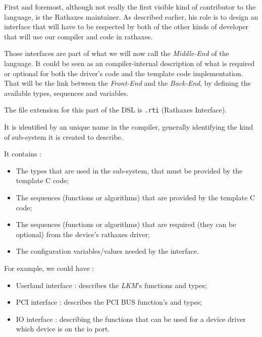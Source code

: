 \documentclass{rtxreport}
\begin{document}
First and foremost, although not really the first visible kind of contributor
to the language, is the Rathaxes maintainer. As described earlier, his role is
to design an interface that will have to be respected by both of the other kinds
of developer that will use our compiler and code in rathaxes.

Those interfaces are part of what we will now call the \emph{Middle-End} of the
language. It could be seen as an compiler-internal description of what is
required or optional for both the driver's code and the template code
implementation. That will be the link between the \emph{Front-End} and the
\emph{Back-End}, by defining the available types, sequences and variables.

The file extension for this part of the DSL is \texttt{.rti} (Rathaxes
                                                              Interface).

It is identified by an unique name in the compiler, generally identifying the
kind of sub-system it is created to describe.

It contains :
\begin{itemize}
    \item The types that are used in the sub-system, that must be provided by
        the template C code;
    \item The sequences (functions or algorithms) that are provided by the
        template C code;
    \item The sequences (functions or algorithms) that are required
        (they can be optional) from the device's rathaxes driver;
    \item The configuration variables/values needed by the interface.
\end{itemize}

For example, we could have :
\begin{itemize}
    \item Userland interface : describes the \emph{LKM}'s functions and types;
    \item PCI interface : describes the PCI BUS function's and types;
    \item IO interface  : describing the functions that can be used
for a device driver which device is on the io port.
\end{itemize}
\end{document}

